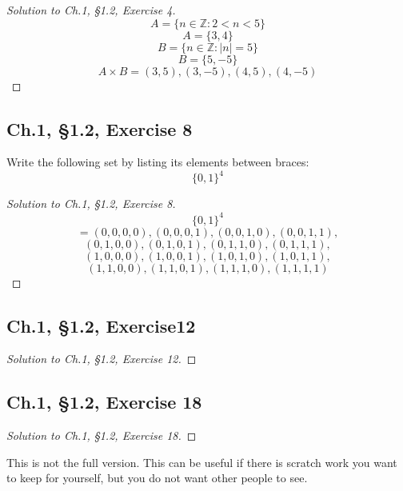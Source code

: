 \documentclass[12pt]{amsart}
\numberwithin{equation}{section}
\theoremstyle{definition}
\theoremstyle{remark}
\newif\ifnotes
\begin{document}
\begin{proof}[Solution to Ch.1, \S 1.2,  Exercise 4]
$$ A = \{n \in \mathbb Z : 2 < n < 5 \} $$
$$ A = \{3, 4\} $$
$$ B = \{n \in \mathbb Z : |n| = 5 \} $$
$$ B = \{5, -5\} $$
$$ A \times B = (3, 5), (3, -5), (4, 5), (4, -5) $$

\end{proof}




\subsection*{Ch.1, \S 1.2,  Exercise 8}  Write the following set by listing its elements between braces: 
$$ \{0, 1\}^4 $$



\begin{proof}[Solution to Ch.1, \S 1.2,  Exercise 8]
$$ \{0, 1\}^4 $$
$$ =(0, 0, 0, 0), (0, 0, 0, 1), (0, 0, 1, 0), (0, 0, 1, 1), $$
$$ (0, 1, 0, 0), (0, 1, 0, 1), (0, 1, 1, 0), (0, 1, 1, 1), $$
$$ (1, 0, 0, 0), (1, 0, 0, 1), (1, 0, 1, 0), (1, 0, 1, 1), $$
$$ (1, 1, 0, 0), (1, 1, 0, 1), (1, 1, 1, 0), (1, 1, 1, 1) $$

\end{proof}




\subsection*{Ch.1, \S 1.2,  Exercise12} 



\begin{proof}[Solution to Ch.1, \S 1.2,  Exercise 12]

\end{proof}





\subsection*{Ch.1, \S 1.2,  Exercise 18} 



\begin{proof}[Solution to Ch.1, \S 1.2,  Exercise 18]

\end{proof}

\ifnotes


\else
	This is not the full version.  This can be useful if there is scratch work you want to keep for yourself, but you do not want other people to see. 
\fi





\end{document}
